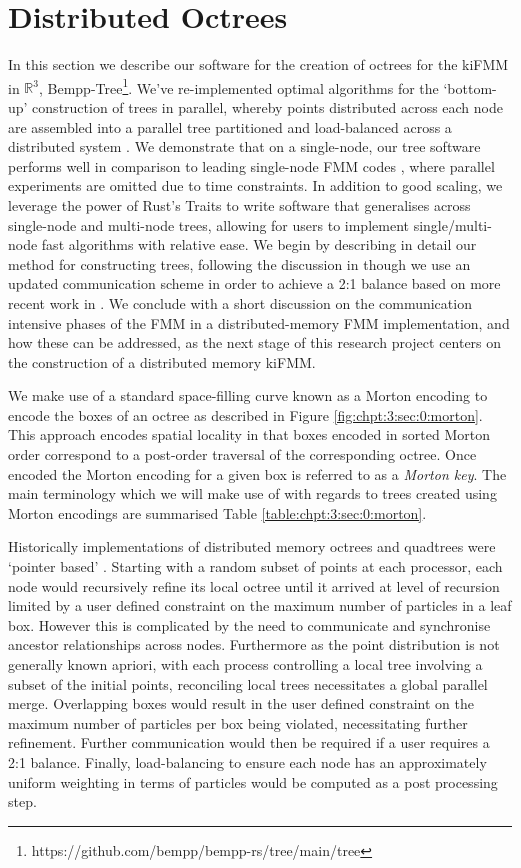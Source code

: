 \section{Distributed Octrees}

In this section we describe our software for the creation of octrees for the kiFMM in $\mathbb{R}^3$, Bempp-Tree\footnote{https://github.com/bempp/bempp-rs/tree/main/tree}. We've re-implemented optimal algorithms for the `bottom-up' construction of trees in parallel, whereby points distributed across each node are assembled into a parallel tree partitioned and load-balanced across a distributed system \cite{sundar2008bottom}. We demonstrate that on a single-node, our tree software performs well in comparison to leading single-node FMM codes \cite{wang2021exafmm}, where parallel experiments are omitted due to time constraints. In addition to good scaling, we leverage the power of Rust's Traits to write software that generalises across single-node and multi-node trees, allowing for users to implement single/multi-node fast algorithms with relative ease. We begin by describing in detail our method for constructing trees, following the discussion in \cite{sundar2008bottom} though we use an updated communication scheme in order to achieve a 2:1 balance based on more recent work in \cite{sundar2013hyksort}. We conclude with a short discussion on the communication intensive phases of the FMM in a distributed-memory FMM implementation, and how these can be addressed, as the next stage of this research project centers on the construction of a distributed memory kiFMM.

We make use of a standard space-filling curve known as a Morton encoding \cite{sundar2008bottom} to encode the boxes of an octree as described in Figure \ref{fig:chpt:3:sec:0:morton}. This approach encodes spatial locality in that boxes encoded in sorted Morton order correspond to a post-order traversal of the corresponding octree. Once encoded the Morton encoding for a given box is referred to as a \textit{Morton key}. The main terminology which we will make use of with regards to trees created using Morton encodings are summarised Table \ref{table:chpt:3:sec:0:morton}.

Historically implementations of distributed memory octrees and quadtrees were `pointer based' \cite{tu2005scalable}. Starting with a random subset of points at each processor, each node would recursively refine its local octree until it arrived at level of recursion limited by a user defined constraint on the maximum number of particles in a leaf box. However this is complicated by the need to communicate and synchronise ancestor relationships across nodes. Furthermore as the point distribution is not generally known apriori, with each process controlling a local tree involving a subset of the initial points, reconciling local trees necessitates a global parallel merge. Overlapping boxes would result in the user defined constraint on the maximum number of particles per box being violated, necessitating further refinement. Further communication would then be required if a user requires a 2:1 balance. Finally, load-balancing to ensure each node has an approximately uniform weighting in terms of particles would be computed as a post processing step.

